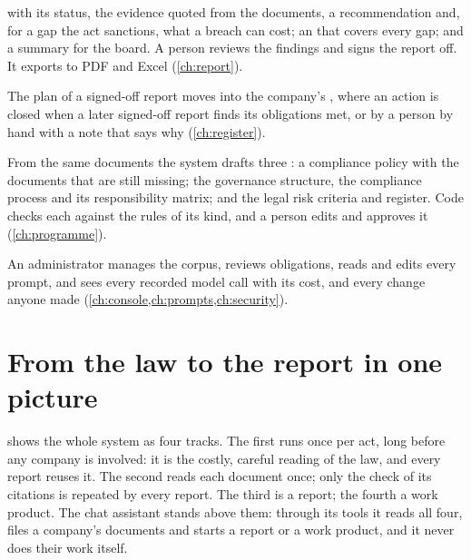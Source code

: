 \begin{description}
    with its status, the evidence quoted from the documents, a recommendation and, for a gap
    the act sanctions, what a breach can cost; an  that covers every gap; and a summary for the board.
    A person reviews the findings and signs the report off. It exports to PDF and Excel
    (\cref{ch:report}).
  \item[Follows the actions over time.] The plan of a signed-off report moves into the
    company's , where an action is closed when a later signed-off
    report finds its obligations met, or by a person by hand with a note that says why
    (\cref{ch:register}).
  \item[Drafts the documents of a compliance programme.] From the same documents the system
    drafts three : a compliance policy with the documents that are still
    missing; the governance structure, the compliance process and its responsibility matrix;
    and the legal risk criteria and register. Code checks each against the rules of its kind,
    and a person edits and approves it (\cref{ch:programme}).
  \item[Shows its own workings.] An administrator manages the corpus, reviews obligations,
    reads and edits every prompt, and sees every recorded model call with its cost, and every change
    anyone made (\cref{ch:console,ch:prompts,ch:security}).
\end{description}

\section{From the law to the report in one picture}\label{sec:intro:picture}

 shows the whole system as four tracks. The first runs once per act, long
before any company is involved: it is the costly, careful reading of the law, and every report
reuses it. The second reads each document once; only the check of its citations is repeated
by every report. The third is a report; the fourth a work product. The chat assistant stands
above them: through its tools it reads all four, files a company's documents and starts a
report or a work product, and it never does their work itself.

